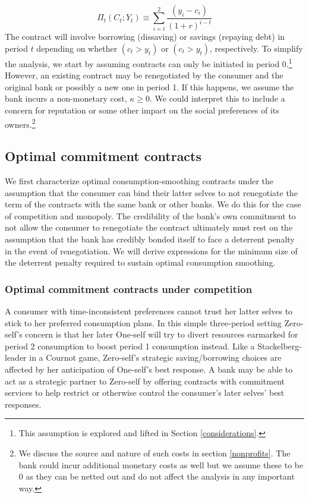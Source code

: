 \documentclass[11pt,english]{article}
\theoremstyle{plain}
\theoremstyle{definition}
\begin{document}
\begin{equation}
\Pi_{t}(C_{t};Y_{t})\equiv\sum\limits _{i=t}^{2}\frac{\left(y_{i}-c_{i}\right)}{\left(1+r\right)^{i-t}}\label{eq:profit}
\end{equation}
The contract will involve borrowing (dissaving) or savings  (repaying debt) in period \(t\) depending on whether \((c_{t}>y_t)\) or  \((c_{t}>y_t) \), respectively.
To simplify the analysis, we start by assuming contracts can only
be initiated in period 0.\footnote{This assumption is explored and lifted in Section \ref{considerations}.}
However, an existing contract may be renegotiated by the consumer
and the original bank or possibly a new one in period 1. If this happens, we assume the bank 
incurs a non-monetary cost, $\kappa\geq0$. We could interpret
this to include a concern for reputation or some other impact on the social
preferences of its owners.\footnote{We discuss the source and nature of such costs in section \ref{nonprofits}. The bank could incur additional monetary costs as well but we assume these to be 0 as they can be netted out and do not affect the analysis in any important way. }


\subsection{Optimal commitment contracts }

We first characterize optimal consumption-smoothing contracts under the assumption that the consumer can bind their
latter selves to not renegotiate the term of the contracts with the same bank or other
banks. We do this for the case of competition and monopoly. The credibility of the bank's own commitment to not allow the consumer to renegotiate the  contract ultimately must rest on the assumption that the bank has
credibly bonded itself to face a deterrent penalty 
in the event of renegotiation. We will derive expressions for the minimum size of the deterrent penalty required to sustain optimal consumption smoothing.

\subsubsection{Optimal commitment contracts under competition}

\label{sec-FCC} A consumer with time-inconsistent preferences cannot
trust her latter selves to stick to her preferred consumption plans.
In this simple three-period setting Zero-self's concern is that her
later One-self will try to divert resources earmarked for period 2
consumption to boost period 1 consumption instead. Like a Stackelberg-leader
in a Cournot game, Zero-self's strategic saving/borrowing choices
are affected by her anticipation of One-self's best response. A bank
may be able to act as a strategic partner to Zero-self by offering
contracts with commitment services to help restrict or otherwise control
the consumer's later selves' best responses.
\end{document}
